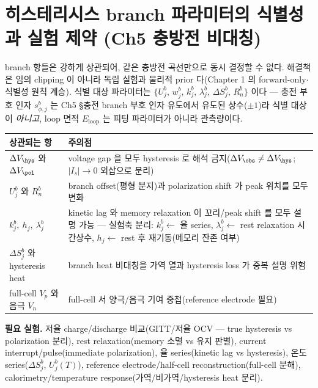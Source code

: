 \section{히스테리시스 branch 파라미터의 식별성과 실험 제약 (Ch5 충방전 비대칭)}\label{sec:ch6_ch5_ident}
branch 항들은 강하게 상관되어, 같은 충방전 곡선만으로 동시 결정할 수 없다. 해결책은 임의 clipping 이 아니라 독립
실험과 물리적 prior 다(Chapter 1 의 forward-only$\cdot$식별성 원칙 계승). 식별 대상 파라미터는
$\{U_j^b,\,w_j^b,\,k_j^b,\,\lambda_j^b,\,\Delta S_j^b,\,R_n^b\}$ 이다 — 충전 부호 인자 $s_{\phi,j}^b$ 는
Ch5 §충전 branch 부호 인자 유도에서 유도된 상수($\pm1$)라 식별 대상이 \emph{아니고}, loop 면적 $E_{\mathrm{loop}}$ 는
피팅 파라미터가 아니라 관측량이다.
\begin{longtable}{p{} >{\raggedright\arraybackslash}p{}}
\toprule 상관되는 항 & 주의점 \\ \midrule \endhead
$\Delta V_\hys$ 와 $\Delta V_\pol$ & voltage gap 을 모두 hysteresis 로 해석 금지($\Delta V_\obs\ne\Delta V_\hys$; $|I_s|\to0$ 외삽으로 분리) \\
$U_j^b$ 와 $R_n^b$ & branch offset(평형 분지)과 polarization shift 가 peak 위치를 모두 변화 \\
$k_j^b,\ h_j,\ \lambda_j^b$ & kinetic lag 와 memory relaxation 이 꼬리/peak shift 를 모두 설명 가능 — 실험축 분리: $k_j^b\leftarrow$ 율 series, $\lambda_j^b\leftarrow$ rest relaxation 시간상수, $h_j\leftarrow$ rest 후 재기동(메모리 잔존 여부) \\
$\Delta S_j^b$ 와 hysteresis heat & branch heat 비대칭을 가역 열과 hysteresis loss 가 중복 설명 위험 \\
full-cell $V_p$ 와 음극 $V_n$ & full-cell 서 양극/음극 기여 중첩(reference electrode 필요) \\
\bottomrule
\end{longtable}
\textbf{필요 실험.} 저율 charge/discharge 비교(GITT/저율 OCV — true hysteresis vs polarization 분리), rest
relaxation(memory 소멸 vs 유지 판별), current interrupt/pulse(immediate polarization), 율 series(kinetic lag
vs hysteresis), 온도 series($\Delta S_j^b$, $U_j^b(T)$), reference electrode/half-cell reconstruction(full-cell
분해), calorimetry/temperature response(가역/비가역/hysteresis heat 분리).

